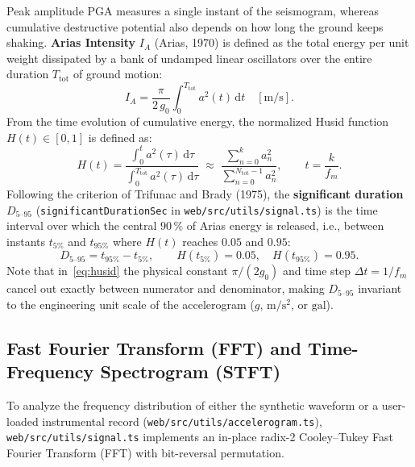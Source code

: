 \documentclass[11pt,a4paper]{article}
\newcommand{\src}[1]{\nolinkurl{#1}}
\newcommand{\dd}{\mathrm d}
\newcommand{\unit}[1]{\mathrm{#1}}
\begin{document}
Peak amplitude $\mathrm{PGA}$ measures a single instant of the seismogram, whereas cumulative destructive
potential also depends on how long the ground keeps shaking. \textbf{Arias Intensity} $I_A$ (Arias, 1970) is
defined as the total energy per unit weight dissipated by a bank of undamped linear oscillators over the entire
duration $T_{\mathrm{tot}}$ of ground motion:
\begin{equation}
  I_A = \frac{\pi}{2\,g_0}\int_0^{T_{\mathrm{tot}}} a^2(t)\,\dd t\quad[\unit{m/s}].
  \label{eq:intensidad-arias}
\end{equation}
From the time evolution of cumulative energy, the normalized Husid function $H(t)\in[0,1]$ is defined as:
\begin{equation}
  H(t) = \frac{\displaystyle\int_0^t a^2(\tau)\,\dd\tau}{\displaystyle\int_0^{T_{\mathrm{tot}}} a^2(\tau)\,\dd\tau}
  \;\approx\;
  \frac{\displaystyle\sum_{n=0}^{k} a_n^2}{\displaystyle\sum_{n=0}^{N_{\mathrm{tot}}-1} a_n^2},
  \qquad t = \frac{k}{f_m}.
  \label{eq:husid}
\end{equation}
Following the criterion of Trifunac and Brady (1975), the \textbf{significant duration} $D_{5\text{--}95}$
(\texttt{significantDurationSec} in \src{web/src/utils/signal.ts}) is the time interval over which the central
$90\,\text{\%}$ of Arias energy is released, i.e., between instants $t_{5\%}$ and $t_{95\%}$ where $H(t)$ reaches
$0.05$ and $0.95$:
\begin{equation}
  D_{5\text{--}95} = t_{95\%} - t_{5\%},
  \qquad
  H(t_{5\%}) = 0.05,\quad H(t_{95\%}) = 0.95.
  \label{eq:duracion-d5-95}
\end{equation}
Note that in~\eqref{eq:husid} the physical constant $\pi/(2g_0)$ and time step $\Delta t = 1/f_m$ cancel out
exactly between numerator and denominator, making $D_{5\text{--}95}$ invariant to the engineering unit scale of
the accelerogram ($g$, $\unit{m/s^2}$, or $\unit{gal}$).

\subsection{Fast Fourier Transform (FFT) and Time-Frequency Spectrogram (STFT)}
\label{sec:sismo-fft-stft}

To analyze the frequency distribution of either the synthetic waveform or a user-loaded instrumental record
(\src{web/src/utils/accelerogram.ts}), \src{web/src/utils/signal.ts} implements an in-place radix-2
Cooley--Tukey Fast Fourier Transform (FFT) with bit-reversal permutation.
\end{document}
